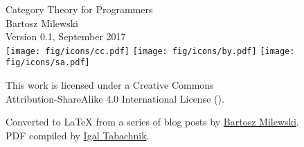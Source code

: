 
%
%




\frontmatter



\pagebreak

\vspace*{\fill}
\thispagestyle{empty}

\begin{small}
\begin{center}

\noindent
Category Theory for Programmers\\

\vspace{1.0em}
\noindent
Bartosz Milewski\\

\vspace{1.26em}
\noindent
Version 0.1, September 2017\\

\vspace{1.6em}
\noindent
\texttt{[image: fig/icons/cc.pdf]}
\texttt{[image: fig/icons/by.pdf]}
\texttt{[image: fig/icons/sa.pdf]}

\vspace{0.4em}
\noindent
This work is licensed under a Creative Commons\\
Attribution-ShareAlike 4.0 International License 
(\href{http://creativecommons.org/licenses/by-sa/4.0/}{}).

\vspace{1.26em}
\noindent
Converted to \LaTeX{} from a series of blog posts by \href{https://bartoszmilewski.com/2014/10/28/category-theory-for-programmers-the-preface/}{Bartosz Milewski}.\\
PDF compiled by \href{https://github.com/hmemcpy/milewski-ctfp-pdf}{Igal Tabachnik}.\\

\end{center}
\end{small}

